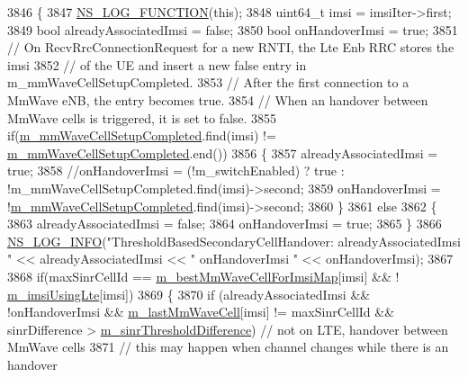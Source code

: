 \begin{DoxyCode}
3846 \{
3847  \hyperlink{log-macros-disabled_8h_a90b90d5bad1f39cb1b64923ea94c0761}{NS\_LOG\_FUNCTION}(\textcolor{keyword}{this});
3848         uint64\_t imsi = imsiIter->first;
3849   \textcolor{keywordtype}{bool} alreadyAssociatedImsi = \textcolor{keyword}{false};
3850   \textcolor{keywordtype}{bool} onHandoverImsi = \textcolor{keyword}{true};
3851   \textcolor{comment}{// On RecvRrcConnectionRequest for a new RNTI, the Lte Enb RRC stores the imsi}
3852   \textcolor{comment}{// of the UE and insert a new false entry in m\_mmWaveCellSetupCompleted.}
3853   \textcolor{comment}{// After the first connection to a MmWave eNB, the entry becomes true.}
3854   \textcolor{comment}{// When an handover between MmWave cells is triggered, it is set to false.}
3855   \textcolor{keywordflow}{if}(\hyperlink{classns3_1_1LteEnbRrc_ad19d6f4c123115e1d13e34609781ab20}{m\_mmWaveCellSetupCompleted}.find(imsi) != 
      \hyperlink{classns3_1_1LteEnbRrc_ad19d6f4c123115e1d13e34609781ab20}{m\_mmWaveCellSetupCompleted}.end())
3856   \{
3857     alreadyAssociatedImsi = \textcolor{keyword}{true};
3858     \textcolor{comment}{//onHandoverImsi = (!m\_switchEnabled) ? true : !m\_mmWaveCellSetupCompleted.find(imsi)->second;}
3859     onHandoverImsi = !\hyperlink{classns3_1_1LteEnbRrc_ad19d6f4c123115e1d13e34609781ab20}{m\_mmWaveCellSetupCompleted}.find(imsi)->second;
3860   \}
3861   \textcolor{keywordflow}{else}
3862   \{
3863     alreadyAssociatedImsi = \textcolor{keyword}{false};
3864     onHandoverImsi = \textcolor{keyword}{true};
3865   \}
3866   \hyperlink{group__logging_gafbd73ee2cf9f26b319f49086d8e860fb}{NS\_LOG\_INFO}(\textcolor{stringliteral}{"ThresholdBasedSecondaryCellHandover: alreadyAssociatedImsi "} << 
      alreadyAssociatedImsi << \textcolor{stringliteral}{" onHandoverImsi "} << onHandoverImsi);
3867 
3868   \textcolor{keywordflow}{if}(maxSinrCellId == \hyperlink{classns3_1_1LteEnbRrc_a38d5bf3d53b16596824f07d4b4a1eab7}{m\_bestMmWaveCellForImsiMap}[imsi] && !
      \hyperlink{classns3_1_1LteEnbRrc_a99427e888b10d095491e72bf062511db}{m\_imsiUsingLte}[imsi])
3869   \{
3870     \textcolor{keywordflow}{if} (alreadyAssociatedImsi && !onHandoverImsi && \hyperlink{classns3_1_1LteEnbRrc_a0d7b04f0383b0dc3f6a7360b87cbaeee}{m\_lastMmWaveCell}[imsi] != maxSinrCellId
       && sinrDifference > \hyperlink{classns3_1_1LteEnbRrc_aef56a65c644f6ed3c5f28a540ded624f}{m\_sinrThresholdDifference}) \textcolor{comment}{// not on LTE, handover between
       MmWave cells}
3871     \textcolor{comment}{// this may happen when channel changes while there is an handover}

\end{DoxyCode}
